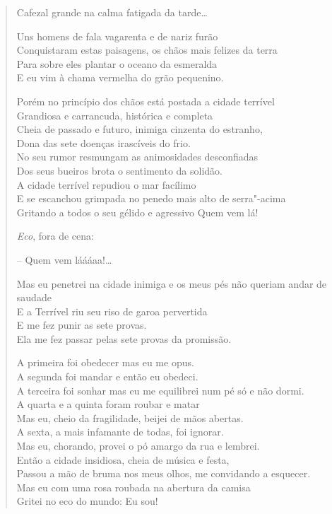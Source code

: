 \begin{verse}
Cafezal grande na calma fatigada da tarde\ldots{}

Uns homens de fala vagarenta e de nariz furão\\
Conquistaram estas paisagens, os chãos mais felizes da terra\\
Para sobre eles plantar o oceano da esmeralda\\
E eu vim à chama vermelha do grão pequenino.

Porém no princípio dos chãos está postada a cidade terrível\\
Grandiosa e carrancuda, histórica e completa\\
Cheia de passado e futuro, inimiga cinzenta do estranho,\\
Dona das sete doenças irascíveis do frio.\\
No seu rumor resmungam as animosidades desconfiadas\\
Dos seus bueiros brota o sentimento da solidão.\\
A cidade terrível repudiou o mar facílimo\\
E se escanchou grimpada no penedo mais alto de serra"-acima\\
Gritando a todos o seu gélido e agressivo Quem vem lá!

\quad\quad\emph{Eco}, fora de cena:

\quad\quad\quad\quad{}-- Quem vem láááaa!\ldots{}


Mas eu penetrei na cidade inimiga e os meus pés não queriam andar de saudade\\
E a Terrível riu seu riso de garoa pervertida\\
E me fez punir as sete provas.\\
Ela me fez passar pelas sete provas da promissão.

A primeira foi obedecer mas eu me opus.\\
A segunda foi mandar e então eu obedeci.\\
A terceira foi sonhar mas eu me equilibrei num pé só e não dormi.\\
A quarta e a quinta foram roubar e matar\\
Mas eu, cheio da fragilidade, beijei de mãos abertas.\\
A sexta, a mais infamante de todas, foi ignorar.\\
Mas eu, chorando, provei o pó amargo da rua e lembrei.\\
Então a cidade insidiosa, cheia de música e festa,\\
Passou a mão de bruma nos meus olhos, me convidando a esquecer.\\
Mas eu com uma rosa roubada na abertura da camisa\\
Gritei no eco do mundo: Eu sou!


\end{verse}
